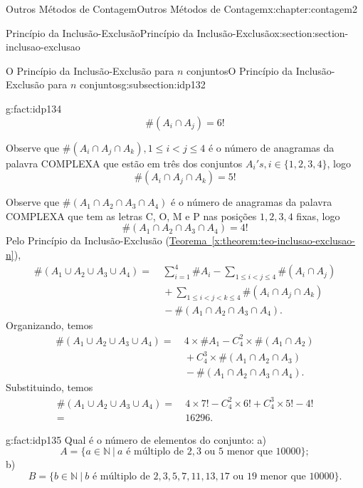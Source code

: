 \documentclass[oneside,10pt,]{book}
\newcommand{\xreffont}{\relax}
\numberwithin{equation}{section}
\newcommand{\lt}{<}
\newcommand{\amp}{&}
\begin{document}
\begin{chapterptx}{Outros Métodos de Contagem}{}{Outros Métodos de Contagem}{}{}{x:chapter:contagem2}
\begin{sectionptx}{Princípio da Inclusão-Exclusão}{}{Princípio da Inclusão-Exclusão}{}{}{x:section:section-inclusao-exclusao}
\begin{subsectionptx}{O Princípio da Inclusão-Exclusão para \(n\) conjuntos}{}{O Princípio da Inclusão-Exclusão para \(n\) conjuntos}{}{}{g:subsection:idp132}
\begin{fact}{}{}{g:fact:idp134}
\begin{equation*}
\#(A_i\cap A_j) = 6!
\end{equation*}
%
\par
Observe que \(\#(A_i\cap A_j\cap A_k), 1\leq i\lt j\leq 4\) é o número de anagramas da palavra COMPLEXA que estão em três dos conjuntos \(A_i's, i\in\{1, 2, 3, 4\}\), logo%
\begin{equation*}
\#(A_i\cap A_j\cap A_k) = 5!
\end{equation*}
%
\par
Observe que \(\#(A_1\cap A_2\cap A_3\cap A_4)\) é o número de anagramas da palavra COMPLEXA que tem as letras C, O, M e P  nas posições \(1, 2, 3, 4\) fixas, logo%
\begin{equation*}
\#(A_1\cap A_2\cap A_3\cap A_4) = 4!
\end{equation*}
Pelo Princípio da Inclusão-Exclusão (\hyperref[x:theorem:teo-inclusao-exclusao-n]{Teorema~{\xreffont\ref{x:theorem:teo-inclusao-exclusao-n}}}),%
\begin{align*}
\#(A_1\cup A_2\cup A_3\cup A_4) = \amp ~\sum_{i=1}^{4} \#A_i - \sum_{1\leq i\lt j\leq 4} \#(A_i\cap A_j) \\
\amp ~ +\sum_{1\leq i\lt j\lt k \leq 4} \#(A_i\cap A_j\cap A_k) \\
\amp ~ -\#(A_1\cap A_2\cap A_3\cap A_4). 
\end{align*}
Organizando, temos%
\begin{align*}
\#(A_1\cup A_2\cup A_3\cup A_4) = \amp ~ 4\times\#A_1 - C_4^2\times\#(A_1\cap A_2) \\
\amp ~ +C_4^3\times\#(A_1\cap A_2\cap A_3) \\
\amp ~ -\#(A_1\cap A_2\cap A_3\cap A_4). 
\end{align*}
Substituindo, temos%
\begin{align*}
\#(A_1\cup A_2\cup A_3\cup A_4) = \amp ~ 4\times 7! - C_4^2\times 6! +C_4^3\times 5! -4! \\
=\amp ~ 16296. 
\end{align*}
%
\end{fact}
\begin{fact}{}{}{g:fact:idp135}%
Qual é o número de elementos do conjunto: a)%
%
\begin{equation*}
A = \{ a\in \mathbb{N}~|~ a \text{ é múltiplo de } 2, 3 \text{ ou } 5 \text{ menor que } 10000\}; 
\end{equation*}
b)%
%
\begin{equation*}
B = \{ b\in \mathbb{N}~|~ b \text{ é múltiplo de } 2, 3, 5, 7, 11, 13, 17 \text{ ou } 19 \text{ menor que } 10000\}. 

\end{equation*}
\end{fact}
\end{subsectionptx}
\end{sectionptx}
\end{chapterptx}
\end{document}
